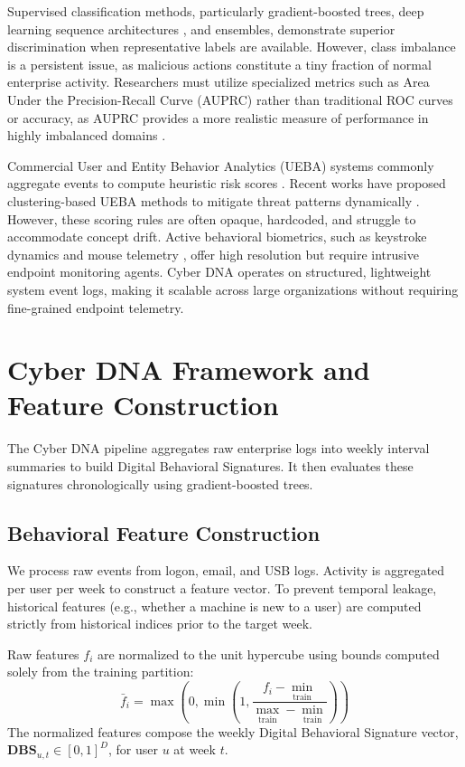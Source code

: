 \documentclass[pdflatex,sn-mathphys-num]{sn-jnl}
\theoremstyle{thmstyleone}
\theoremstyle{thmstyletwo}
\theoremstyle{thmstylethree}
\begin{document}
Supervised classification methods, particularly gradient-boosted trees, deep learning sequence architectures \cite{yuan2021deep}, and ensembles, demonstrate superior discrimination when representative labels are available. However, class imbalance is a persistent issue, as malicious actions constitute a tiny fraction of normal enterprise activity. Researchers must utilize specialized metrics such as Area Under the Precision-Recall Curve (AUPRC) rather than traditional ROC curves or accuracy, as AUPRC provides a more realistic measure of performance in highly imbalanced domains \cite{lindauer2014generating}.

Commercial User and Entity Behavior Analytics (UEBA) systems commonly aggregate events to compute heuristic risk scores \cite{homoliak2019insight}. Recent works have proposed clustering-based UEBA methods to mitigate threat patterns dynamically \cite{sheikhalishahi2022clustering}. However, these scoring rules are often opaque, hardcoded, and struggle to accommodate concept drift. Active behavioral biometrics, such as keystroke dynamics and mouse telemetry \cite{alsulami2018biometric, broderick2013active}, offer high resolution but require intrusive endpoint monitoring agents. Cyber DNA operates on structured, lightweight system event logs, making it scalable across large organizations without requiring fine-grained endpoint telemetry.

\section{Cyber DNA Framework and Feature Construction}\label{sec3}
The Cyber DNA pipeline aggregates raw enterprise logs into weekly interval summaries to build Digital Behavioral Signatures. It then evaluates these signatures chronologically using gradient-boosted trees.

\subsection{Behavioral Feature Construction}\label{subsec3_1}
We process raw events from logon, email, and USB logs. Activity is aggregated per user per week to construct a feature vector. To prevent temporal leakage, historical features (e.g., whether a machine is new to a user) are computed strictly from historical indices prior to the target week. 

Raw features $f_i$ are normalized to the unit hypercube using bounds computed solely from the training partition:
\begin{equation}
\bar{f}_i = \max\left(0, \min\left(1, \frac{f_i - \min_{\text{train}}}{\max_{\text{train}} - \min_{\text{train}}}\right)\right)
\label{eq:norm}
\end{equation}
The normalized features compose the weekly Digital Behavioral Signature vector, $\mathbf{DBS}_{u,t} \in [0,1]^D$, for user $u$ at week $t$.
\end{document}
